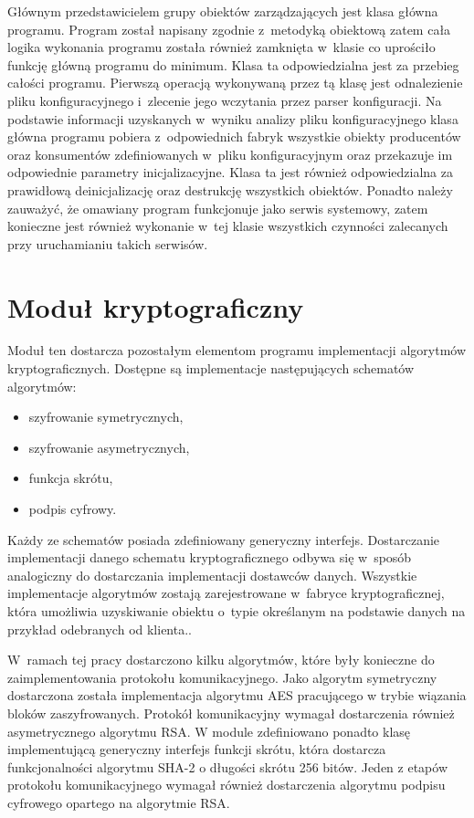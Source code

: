 Głównym przedstawicielem grupy obiektów zarządzających jest klasa główna
programu. Program został napisany zgodnie z~metodyką obiektową zatem
cała logika wykonania programu została również zamknięta w~klasie co
uprościło funkcję główną programu do minimum. Klasa ta odpowiedzialna
jest za przebieg całości programu. Pierwszą operacją wykonywaną przez
tą klasę jest odnalezienie pliku konfiguracyjnego i~zlecenie jego
wczytania przez parser konfiguracji. Na podstawie informacji
uzyskanych w~wyniku analizy pliku konfiguracyjnego klasa główna
programu pobiera z~odpowiednich fabryk wszystkie obiekty producentów
oraz konsumentów zdefiniowanych w~pliku konfiguracyjnym oraz
przekazuje im odpowiednie parametry inicjalizacyjne. Klasa ta jest
również odpowiedzialna za prawidłową deinicjalizację oraz destrukcję
wszystkich obiektów. Ponadto należy zauważyć, że omawiany program
funkcjonuje jako serwis systemowy, zatem konieczne jest również
wykonanie w~tej klasie wszystkich czynności zalecanych przy
uruchamianiu takich serwisów.

\section[Moduł kryptograficzny][Moduł kryptograficzny]{Moduł kryptograficzny}

Moduł ten dostarcza pozostałym elementom programu implementacji
algorytmów kryptograficznych. Dostępne są implementacje następujących
schematów algorytmów:

\begin{itemize}
\item szyfrowanie symetrycznych,
\item szyfrowanie asymetrycznych,
\item funkcja skrótu,
\item podpis cyfrowy.
\end{itemize}

Każdy ze schematów posiada zdefiniowany generyczny
interfejs. Dostarczanie implementacji danego schematu
kryptograficznego odbywa się w~sposób analogiczny do dostarczania
implementacji dostawców danych. Wszystkie implementacje algorytmów
zostają zarejestrowane w~fabryce kryptograficznej, która umożliwia
uzyskiwanie obiektu o~typie określanym na podstawie danych na przykład
odebranych od klienta..

W~ramach tej pracy dostarczono kilku algorytmów, które były konieczne
do zaimplementowania protokołu komunikacyjnego. Jako algorytm
symetryczny dostarczona została implementacja algorytmu AES
pracującego w trybie wiązania bloków zaszyfrowanych. Protokół
komunikacyjny wymagał dostarczenia również asymetrycznego algorytmu
RSA. W module zdefiniowano ponadto klasę implementującą generyczny
interfejs funkcji skrótu, która dostarcza funkcjonalności algorytmu
SHA-2 o długości skrótu 256 bitów. Jeden z etapów protokołu
komunikacyjnego wymagał również dostarczenia algorytmu podpisu
cyfrowego opartego na algorytmie RSA.

